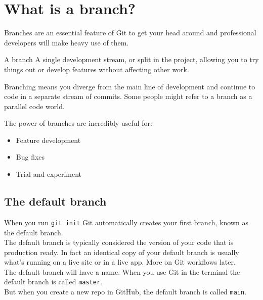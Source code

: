 \section{What is a branch?}

Branches are an essential feature of Git to get your head around and professional developers will make heavy use of them.
\\

\begin{infobox}{A branch}
	A single development stream, or split in the project, allowing you to try things out or develop features without affecting other work.
\end{infobox}

Branching means you diverge from the main line of development and continue to code in a separate stream of commits. Some people might refer to a branch as a parallel code world.
\\



The power of branches are incredibly useful for:
\begin{itemize}
    \item Feature development
    \item Bug fixes
    \item Trial and experiment
\end{itemize}

\subsection{The default branch}

When you run \texttt{git init} Git automatically creates your first branch, known as the default branch.
\\

The default branch is typically considered the version of your code that is production ready. In fact an identical copy of your default branch is usually what's running on a live site or in a live app. More on Git workflows later.
\\

The default branch will have a name. When you use Git in the terminal the default branch is called \texttt{master}.
\\

But when you create a new repo in GitHub, the default branch is called \texttt{main}.
\\

